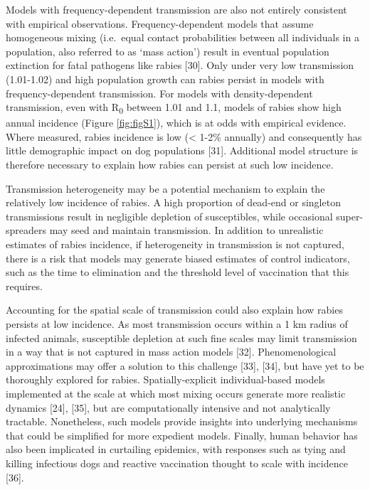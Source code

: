 \documentclass[
  oneside]{book}
\begin{document}
Models with frequency-dependent transmission are also not entirely
consistent with empirical observations. Frequency-dependent models that
assume homogeneous mixing (i.e.~equal contact probabilities between all
individuals in a population, also referred to as `mass action') result
in eventual population extinction for fatal pathogens like rabies
{[}30{]}. Only under very low transmission (1.01-1.02) and high population
growth can rabies persist in models with frequency-dependent
transmission. For models with density-dependent transmission, even with
R\textsubscript{0} between 1.01 and 1.1, models of rabies show high annual incidence
(Figure \ref{fig:figS1}), which is at odds with empirical evidence. Where
measured, rabies incidence is low (\textless{} 1-2\% annually) and consequently
has little demographic impact on dog populations {[}31{]}. Additional
model structure is therefore necessary to explain how rabies can persist
at such low incidence.

Transmission heterogeneity may be a potential mechanism to explain the
relatively low incidence of rabies. A high proportion of dead-end or
singleton transmissions result in negligible depletion of susceptibles,
while occasional super-spreaders may seed and maintain transmission. In
addition to unrealistic estimates of rabies incidence, if heterogeneity
in transmission is not captured, there is a risk that models may
generate biased estimates of control indicators, such as the time to
elimination and the threshold level of vaccination that this requires.

Accounting for the spatial scale of transmission could also explain how
rabies persists at low incidence. As most transmission occurs within a 1
km radius of infected animals, susceptible depletion at such fine scales
may limit transmission in a way that is not captured in mass action
models {[}32{]}. Phenomenological approximations may offer a solution to
this challenge {[}33{]}, {[}34{]}, but have yet to be thoroughly explored
for rabies. Spatially-explicit individual-based models implemented at
the scale at which most mixing occurs generate more realistic dynamics
{[}24{]}, {[}35{]}, but are computationally intensive and not analytically
tractable. Nonetheless, such models provide insights into underlying
mechanisms that could be simplified for more expedient models. Finally,
human behavior has also been implicated in curtailing epidemics, with
responses such as tying and killing infectious dogs and reactive
vaccination thought to scale with incidence {[}36{]}.
\end{document}
